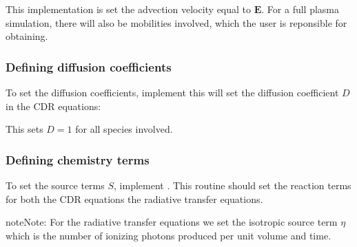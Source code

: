 \documentclass[letterpaper,10pt,english]{sphinxmanual}
\begin{document}
This implementation is set the advection velocity equal to \(\mathbf{E}\).
For a full plasma simulation, there will also be mobilities involved, which the user is reponsible for obtaining.


\subsubsection{Defining diffusion coefficients}
\label{\detokenize{Applications/CdrPlasmaModel:defining-diffusion-coefficients}}
To set the diffusion coefficients, implement  \textendash{} this will set the diffusion coefficient \(D\) in the CDR equations:

\begin{sphinxVerbatim}[commandchars=\\\{\},formatcom=\scriptsize]
           
                                                   
                                                   
                                                 
     
\end{sphinxVerbatim}

This sets \(D = 1\) for all species involved.


\subsubsection{Defining chemistry terms}
\label{\detokenize{Applications/CdrPlasmaModel:defining-chemistry-terms}}
To set the source terms \(S\), implement .
This routine should set the reaction terms for both the CDR equations  the radiative transfer equations.

\begin{sphinxadmonition}{note}{Note:}
For the radiative transfer equations we set the isotropic source term \(\eta\) which is the number of ionizing photons produced per unit volume and time.
\end{sphinxadmonition}
\end{document}
